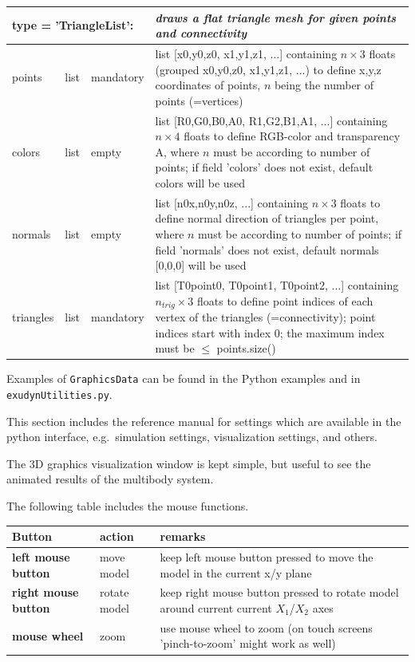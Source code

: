 \documentclass[11pt,a4paper]{book} %
\begin{document}
\begin{center}
\begin{longtable}{| p{3cm} | p{2cm} | p{3cm} | p{7.5cm} |}
	\multicolumn{3}{l}{\parbox{8cm}{\bf type = 'TriangleList': }} & \multicolumn{1}{l}{\parbox{7.5cm}{\it draws a flat triangle mesh for given points and connectivity}}\\ \hline
  points & list & mandatory & list [x0,y0,z0, x1,y1,z1, ...] containing $n \times 3$ floats (grouped x0,y0,z0, x1,y1,z1, ...) to define x,y,z coordinates of points, $n$ being the number of points (=vertices)\\ \hline
  colors & list & empty & list [R0,G0,B0,A0, R1,G2,B1,A1, ...] containing $n \times 4$ floats to define RGB-color and transparency A, where $n$ must be according to number of points; if field 'colors' does not exist, default colors will be used\\ \hline
  normals & list & empty & list [n0x,n0y,n0z, ...] containing $n \times 3$ floats to define normal direction of triangles per point, where $n$ must be according to number of points; if field 'normals' does not exist, default normals [0,0,0] will be used\\ \hline
  triangles & list &  mandatory & list [T0point0, T0point1, T0point2, ...] containing $n_{trig} \times 3$ floats to define point indices of each vertex of the triangles (=connectivity); point indices start with index 0; the maximum index must be $\le$ points.size()\\ \hline
\end{longtable}
%
\end{center}
%
Examples of \texttt{GraphicsData} can be found in the Python examples and in \texttt{exudynUtilities.py}.

This section includes the reference manual for settings which are available in the python interface, e.g.\ simulation settings, visualization settings, and others.




The 3D graphics visualization window is kept simple, but useful to see the animated results of the multibody system.

The following table includes the mouse functions. 

\begin{center}
  \footnotesize
  \begin{longtable}{| p{4cm} | p{4cm} | p{8cm} |} 
	\hline
  \bf Button & action & \bf remarks \\ \hline
  \bf left mouse button & move model & keep left mouse button pressed to move the model in the current x/y plane\\ \hline
  \bf right mouse button & rotate model & keep right mouse button pressed to rotate model around current current $X_1$/$X_2$ axes\\ \hline
  \bf mouse wheel & zoom & use mouse wheel to zoom (on touch screens 'pinch-to-zoom' might work as well) \\ \hline
  \end{longtable}
\end{center}
\end{document}
